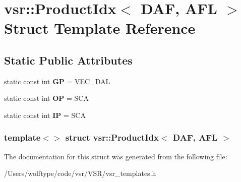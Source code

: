 \hypertarget{structvsr_1_1_product_idx_3_01_d_a_f_00_01_a_f_l_01_4}{\section{vsr\-:\-:Product\-Idx$<$ D\-A\-F, A\-F\-L $>$ Struct Template Reference}
\label{structvsr_1_1_product_idx_3_01_d_a_f_00_01_a_f_l_01_4}
}
\subsection*{Static Public Attributes}
\begin{DoxyCompactItemize}
\item 
\hypertarget{structvsr_1_1_product_idx_3_01_d_a_f_00_01_a_f_l_01_4_a8964ce6e622e19bcefea67b260b3b494}{static const int {\bfseries G\-P} = V\-E\-C\-\_\-\-D\-A\-L}\label{structvsr_1_1_product_idx_3_01_d_a_f_00_01_a_f_l_01_4_a8964ce6e622e19bcefea67b260b3b494}

\item 
\hypertarget{structvsr_1_1_product_idx_3_01_d_a_f_00_01_a_f_l_01_4_a1cd4dc5cc4c6bdd20f4e23cde442458f}{static const int {\bfseries O\-P} = S\-C\-A}\label{structvsr_1_1_product_idx_3_01_d_a_f_00_01_a_f_l_01_4_a1cd4dc5cc4c6bdd20f4e23cde442458f}

\item 
\hypertarget{structvsr_1_1_product_idx_3_01_d_a_f_00_01_a_f_l_01_4_ad5db6a420564de99ca5816998871a3c0}{static const int {\bfseries I\-P} = S\-C\-A}\label{structvsr_1_1_product_idx_3_01_d_a_f_00_01_a_f_l_01_4_ad5db6a420564de99ca5816998871a3c0}

\end{DoxyCompactItemize}
\subsubsection*{template$<$$>$ struct vsr\-::\-Product\-Idx$<$ D\-A\-F, A\-F\-L $>$}



The documentation for this struct was generated from the following file\-:\begin{DoxyCompactItemize}
\item 
/\-Users/wolftype/code/vsr/\-V\-S\-R/vsr\-\_\-templates.\-h\end{DoxyCompactItemize}

